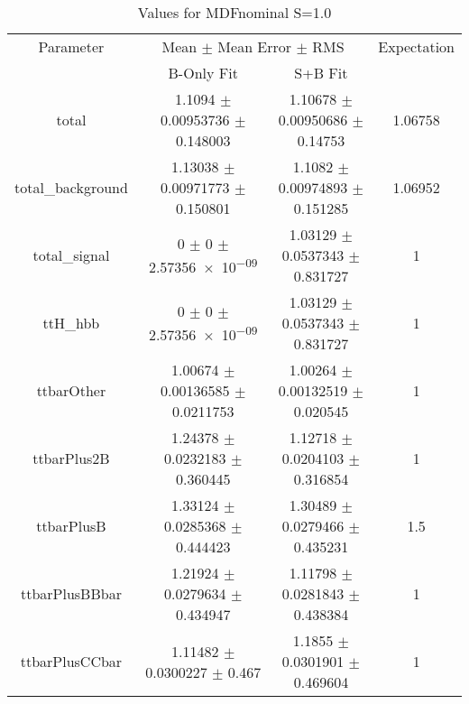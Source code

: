 \begin{table}
\centering
\caption{Values for MDFnominal S=1.0}
\begin{tabular}{cccc}
\toprule
Parameter & \multicolumn{2}{c}{Mean $\pm$ Mean Error $\pm$ RMS} & Expectation\\
 & B-Only Fit & S+B Fit & \\
\midrule
total & \num{1.1094} $\pm$ \num{0.00953736} $\pm$ \num{0.148003} & \num{1.10678} $\pm$ \num{0.00950686} $\pm$ \num{0.14753} & \num{1.06758}\\
total\_background & \num{1.13038} $\pm$ \num{0.00971773} $\pm$ \num{0.150801} & \num{1.1082} $\pm$ \num{0.00974893} $\pm$ \num{0.151285} & \num{1.06952}\\
total\_signal & \num{0} $\pm$ \num{0} $\pm$ \num{2.57356e-09} & \num{1.03129} $\pm$ \num{0.0537343} $\pm$ \num{0.831727} & \num{1}\\
ttH\_hbb & \num{0} $\pm$ \num{0} $\pm$ \num{2.57356e-09} & \num{1.03129} $\pm$ \num{0.0537343} $\pm$ \num{0.831727} & \num{1}\\
ttbarOther & \num{1.00674} $\pm$ \num{0.00136585} $\pm$ \num{0.0211753} & \num{1.00264} $\pm$ \num{0.00132519} $\pm$ \num{0.020545} & \num{1}\\
ttbarPlus2B & \num{1.24378} $\pm$ \num{0.0232183} $\pm$ \num{0.360445} & \num{1.12718} $\pm$ \num{0.0204103} $\pm$ \num{0.316854} & \num{1}\\
ttbarPlusB & \num{1.33124} $\pm$ \num{0.0285368} $\pm$ \num{0.444423} & \num{1.30489} $\pm$ \num{0.0279466} $\pm$ \num{0.435231} & \num{1.5}\\
ttbarPlusBBbar & \num{1.21924} $\pm$ \num{0.0279634} $\pm$ \num{0.434947} & \num{1.11798} $\pm$ \num{0.0281843} $\pm$ \num{0.438384} & \num{1}\\
ttbarPlusCCbar & \num{1.11482} $\pm$ \num{0.0300227} $\pm$ \num{0.467} & \num{1.1855} $\pm$ \num{0.0301901} $\pm$ \num{0.469604} & \num{1}\\
\bottomrule
\end{tabular}
\end{table}